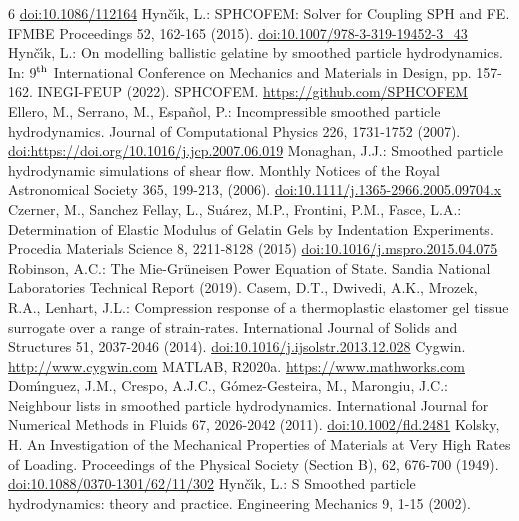 \documentclass{svproc}
\begin{document}
\begin{thebibliography}{6}
\url{doi:10.1086/112164}
%
Hyn\v{c}\'{\i}k, L.: SPHCOFEM: Solver for Coupling SPH and FE. IFMBE Proceedings 52, 162-165 (2015). 
\url{doi:10.1007/978-3-319-19452-3_43}
%
Hyn\v{c}\'{\i}k, L.: On modelling ballistic gelatine by smoothed particle hydrodynamics. In: 9$^{\mbox{\scriptsize th}}$ International Conference on Mechanics and Materials in Design, pp. 157-162. INEGI-FEUP (2022).
%
SPHCOFEM. \url{https://github.com/SPHCOFEM}
%
Ellero, M., Serrano, M., Español, P.: Incompressible smoothed particle hydrodynamics. Journal of Computational Physics 226, 1731-1752 (2007). 
\url{doi:https://doi.org/10.1016/j.jcp.2007.06.019}
%
Monaghan, J.J.: Smoothed particle hydrodynamic simulations of shear flow. Monthly Notices of the Royal Astronomical Society 365, 199-213, (2006).
\url{doi:10.1111/j.1365-2966.2005.09704.x}
%
Czerner, M., Sanchez Fellay, L., Su\'arez, M.P., Frontini, P.M., Fasce, L.A.: Determination of Elastic Modulus of Gelatin Gels by Indentation Experiments. Procedia Materials Science 8, 2211-8128 (2015)
\url{doi:10.1016/j.mspro.2015.04.075}
%
Robinson, A.C.: The Mie-Grüneisen Power Equation of State. Sandia National Laboratories Technical Report (2019).
%
Casem, D.T., Dwivedi, A.K., Mrozek, R.A., Lenhart, J.L.: Compression response of a thermoplastic elastomer gel tissue surrogate over a range of strain-rates. International Journal of Solids and Structures 51, 2037-2046 (2014). 
\url{doi:10.1016/j.ijsolstr.2013.12.028}
%
Cygwin. \url{http://www.cygwin.com}
%
%
MATLAB, R2020a. \url{https://www.mathworks.com}
%
Dom\'{\i}nguez, J.M., Crespo, A.J.C., G\'omez-Gesteira, M., Marongiu, J.C.: Neighbour lists in smoothed particle hydrodynamics. International Journal for Numerical Methods in Fluids 67, 2026-2042 (2011).
\url{doi:10.1002/fld.2481}
%
Kolsky, H. An Investigation of the Mechanical Properties of Materials at Very High Rates of Loading. Proceedings of the Physical Society (Section B), 62, 676-700 (1949).
\url{doi:10.1088/0370-1301/62/11/302}
%
Hyn\v{c}\'{\i}k, L.: S Smoothed particle hydrodynamics: theory and practice. Engineering Mechanics 9, 1-15 (2002). 
%


\end{thebibliography}
\end{document}
